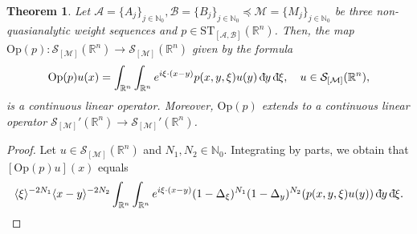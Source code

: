 \documentclass[11pt,reqno]{amsart}
\numberwithin{equation}{section}
\newcommand{\dbar}{\mathrm{d}\hspace*{-0.15em}\bar{}\hspace*{0.1em}}
\newtheorem{theorem}{Theorem}[section]
\newcommand{\R}{{\mathbb{R}}} %
\newcommand{\caS}{{\mathcal{S}}}
\newcommand{\ST}{{\mathrm{ST}}}
\newcommand{\Mj}{{\{M_j\}_{j\in\mathbb{N}_0}}} %
\newcommand{\Aj}{{\{A_j\}_{j\in\mathbb{N}_0}}} %
\newcommand{\Bj}{{\{B_j\}_{j\in\mathbb{N}_0}}} %
\newcommand{\M}{{\mathcal{M}}} %
\newcommand{\A}{{\mathcal{A}}} %
\newcommand{\B}{{\mathcal{B}}} %
\begin{document}
\begin{theorem}\label{thm_ST}
	Let $\A=\Aj,\B=\Bj\preceq\M=\Mj$ be three non-quasianalytic weight sequences and $p\in \ST_{[\A,\B]}(\mathbb{R}^n)$. Then, the map $\mathrm{Op}(p):\caS_{[\M]}(\R^n)\to\caS_{[\M]}(\R^n)$ given by the formula
	\begin{equation}\label{pseudo_def}
		\mathrm{Op}(p)u(x) = \int_{\mathbb{R}^n}\int_{\mathbb{R}^n}e^{i\xi\cdot (x-y)}p(x,y,\xi){u}(y)\,\dbar y\,\dbar\xi,\quad u\in\caS_{[\M]}(\R^n),
	\end{equation}
	is a continuous linear operator. Moreover, $\mathrm{Op}(p)$ extends to a continuous linear operator $\mathcal{S}_{[\M]}'(\R^n) \to \mathcal{S}_{[\M]}'(\R^n)$.
\end{theorem}
%
\begin{proof}
	Let $u \in \caS_{[\M]}(\R^n)$ and $N_1,N_2\in\mathbb{N}_0$. Integrating by parts, we obtain that $[\mathrm{Op}(p)u](x)$ equals
	\begin{equation}\label{I_x_xi}
		\langle\xi\rangle^{-2N_1} \langle x-y\rangle^{-2N_2} \int_{\mathbb{R}^n}\int_{\mathbb{R}^n} e^{i\xi\cdot(x-y)} (1-\Delta_\xi)^{N_1} (1-\Delta_y)^{N_2} (p(x,y,\xi)u(y))\,\dbar y\,\dbar \xi.
	\end{equation}
	

\end{proof}
\end{document}
